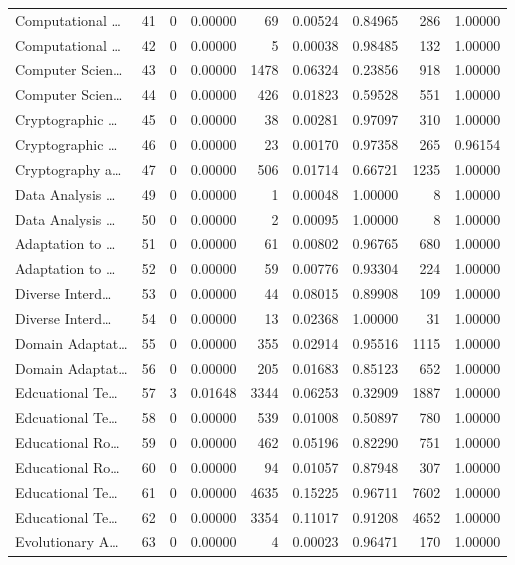 \begin{table}
\begin{tabular}{lrrrrrrrr}
Computational … & 41 & 0 & 0.00000 & 69 & 0.00524 & 0.84965 & 286 & 1.00000 \\
Computational … & 42 & 0 & 0.00000 & 5 & 0.00038 & 0.98485 & 132 & 1.00000 \\
Computer Scien… & 43 & 0 & 0.00000 & 1478 & 0.06324 & 0.23856 & 918 & 1.00000 \\
Computer Scien… & 44 & 0 & 0.00000 & 426 & 0.01823 & 0.59528 & 551 & 1.00000 \\
Cryptographic … & 45 & 0 & 0.00000 & 38 & 0.00281 & 0.97097 & 310 & 1.00000 \\
Cryptographic … & 46 & 0 & 0.00000 & 23 & 0.00170 & 0.97358 & 265 & 0.96154 \\
Cryptography a… & 47 & 0 & 0.00000 & 506 & 0.01714 & 0.66721 & 1235 & 1.00000 \\
Data Analysis … & 49 & 0 & 0.00000 & 1 & 0.00048 & 1.00000 & 8 & 1.00000 \\
Data Analysis … & 50 & 0 & 0.00000 & 2 & 0.00095 & 1.00000 & 8 & 1.00000 \\
Adaptation to … & 51 & 0 & 0.00000 & 61 & 0.00802 & 0.96765 & 680 & 1.00000 \\
Adaptation to … & 52 & 0 & 0.00000 & 59 & 0.00776 & 0.93304 & 224 & 1.00000 \\
Diverse Interd… & 53 & 0 & 0.00000 & 44 & 0.08015 & 0.89908 & 109 & 1.00000 \\
Diverse Interd… & 54 & 0 & 0.00000 & 13 & 0.02368 & 1.00000 & 31 & 1.00000 \\
Domain Adaptat… & 55 & 0 & 0.00000 & 355 & 0.02914 & 0.95516 & 1115 & 1.00000 \\
Domain Adaptat… & 56 & 0 & 0.00000 & 205 & 0.01683 & 0.85123 & 652 & 1.00000 \\
Edcuational Te… & 57 & 3 & 0.01648 & 3344 & 0.06253 & 0.32909 & 1887 & 1.00000 \\
Edcuational Te… & 58 & 0 & 0.00000 & 539 & 0.01008 & 0.50897 & 780 & 1.00000 \\
Educational Ro… & 59 & 0 & 0.00000 & 462 & 0.05196 & 0.82290 & 751 & 1.00000 \\
Educational Ro… & 60 & 0 & 0.00000 & 94 & 0.01057 & 0.87948 & 307 & 1.00000 \\
Educational Te… & 61 & 0 & 0.00000 & 4635 & 0.15225 & 0.96711 & 7602 & 1.00000 \\
Educational Te… & 62 & 0 & 0.00000 & 3354 & 0.11017 & 0.91208 & 4652 & 1.00000 \\
Evolutionary A… & 63 & 0 & 0.00000 & 4 & 0.00023 & 0.96471 & 170 & 1.00000 \\

\end{tabular}
\end{table}
